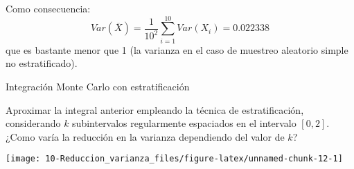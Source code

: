 \documentclass[
]{book}
\newenvironment{Shaded}{\begin{snugshade}}{\end{snugshade}}
\newcommand{\CommentTok}[1]{\textcolor[rgb]{0.56,0.35,0.01}{\textit{#1}}}
\newcommand{\ControlFlowTok}[1]{\textcolor[rgb]{0.13,0.29,0.53}{\textbf{#1}}}
\newcommand{\DataTypeTok}[1]{\textcolor[rgb]{0.13,0.29,0.53}{#1}}
\newcommand{\DecValTok}[1]{\textcolor[rgb]{0.00,0.00,0.81}{#1}}
\newcommand{\KeywordTok}[1]{\textcolor[rgb]{0.13,0.29,0.53}{\textbf{#1}}}
\newcommand{\NormalTok}[1]{#1}
\newcommand{\OperatorTok}[1]{\textcolor[rgb]{0.81,0.36,0.00}{\textbf{#1}}}
\newcommand{\StringTok}[1]{\textcolor[rgb]{0.31,0.60,0.02}{#1}}
\theoremstyle{break}
\theoremstyle{definition}
\theoremstyle{definition}
\theoremstyle{definition}
\theoremstyle{remark}
\let\BeginKnitrBlock\begin \let\EndKnitrBlock\end
\begin{document}
Como consecuencia:
\[Var\left(  \overline{X}\right)  =\frac{1}{10^{2}}\sum_{i=1}^{10}
Var\left( X_{i} \right)  = 0.022338\]
que es bastante menor que 1
(la varianza en el caso de muestreo aleatorio simple no estratificado).

\BeginKnitrBlock{exercise}
\protect\hypertarget{exr:unnamed-chunk-11}{}{\label{exr:unnamed-chunk-11} }Integración Monte Carlo con estratificación
\EndKnitrBlock{exercise}

Aproximar la integral anterior empleando la técnica de
estratificación, considerando \(k\) subintervalos regularmente
espaciados en el intervalo \(\left[ 0, 2 \right]\). ¿Como varía la
reducción en la varianza dependiendo del valor de \(k\)?

\begin{Shaded}
\end{Shaded}

\begin{center}\texttt{[image: 10-Reduccion\_varianza\_files/figure-latex/unnamed-chunk-12-1]} \end{center}
\end{document}
